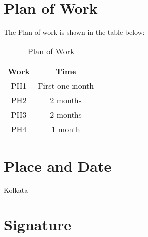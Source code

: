 \documentclass[margin, centered]{res}
\begin{document}
\begin{resume}
\section{Plan of Work} The Plan of work is shown in the table below:

\begin{table}[ht]
\caption{Plan of Work}
\centering
\begin{tabular}{c c}
\hline \hline
Work & Time \\
\hline
PH1 & First one month\\
PH2 & 2 months\\
PH3 & 2 months\\
PH4 & 1 month\\

\end{tabular}
\end{table}

\section{Place and Date} Kolkata

\section{Signature}

\end{resume}
\end{document}
